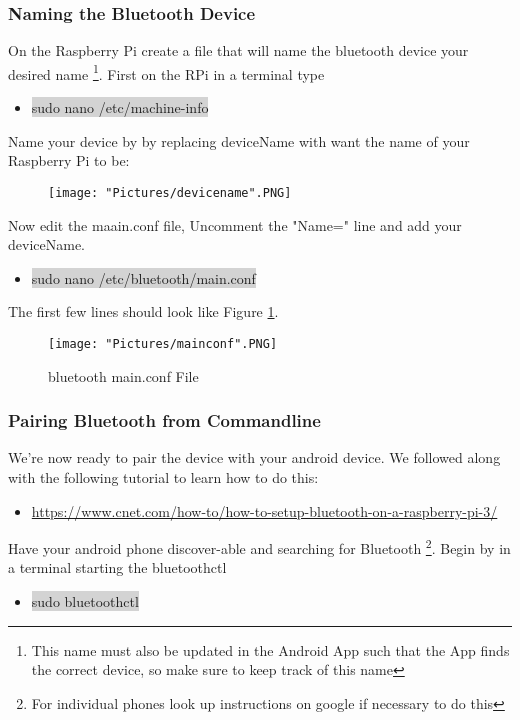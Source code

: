 \documentclass[12pt]{article}
\begin{document}
\subsubsection{Naming the Bluetooth Device}

On the Raspberry Pi create a file that will name the bluetooth device your desired name \footnote{This name must also be updated in the Android App such that the App finds the correct device, so make sure to keep track of this name}. First on the RPi in a terminal type 
\begin{itemize}
	\item[] \colorbox{lightgray}{sudo nano /etc/machine-info} 
\end{itemize}
\noindent Name your device by by replacing deviceName with want the name of your Raspberry Pi to be:

\begin{figure}[H]
 	\centering
	\texttt{[image: "Pictures/devicename".PNG]}
\end{figure}

\noindent Now edit the maain.conf file, Uncomment the "Name=" line and add your deviceName. 
\begin{itemize}
	\item[] \colorbox{lightgray}{sudo nano /etc/bluetooth/main.conf} 
\end{itemize}

\noindent The first few lines should look like Figure \ref{conf}.

\begin{figure}[H]
 	\centering
	\texttt{[image: "Pictures/mainconf".PNG]}
	\caption{bluetooth main.conf File}
	\label{conf}
\end{figure}

\subsubsection{Pairing Bluetooth from Commandline}
We're now ready to pair the device with your android device. We followed along with the following tutorial to learn how to do this:

\begin{itemize}
	\item \href{https://www.cnet.com/how-to/how-to-setup-bluetooth-on-a-raspberry-pi-3/}{https://www.cnet.com/how-to/how-to-setup-bluetooth-on-a-raspberry-pi-3/}
\end{itemize}

Have your android phone discover-able and searching for Bluetooth \footnote{For individual phones look up instructions on google if necessary to do this}. Begin by in a terminal starting the bluetoothctl
\begin{itemize}
	\item[] \colorbox{lightgray}{sudo bluetoothctl}
\end{itemize}
\end{document}
